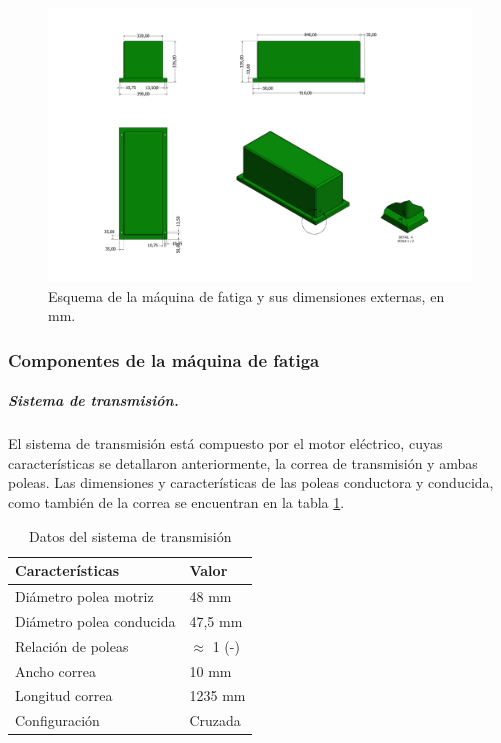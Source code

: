 \begin{figure}[h]
\centering
\includegraphics[width=1\linewidth, trim={10cm 37cm 17cm 2cm},clip]{Imagenes/MaqFatiga-1.pdf}
\caption{Esquema de la máquina de fatiga y sus dimensiones externas, en mm.}
\label{fig:diag_maqfat}
\end{figure}

\subsubsection{Componentes de la máquina de fatiga}
\subparagraph{Sistema de transmisión.}
El sistema de transmisión está compuesto por el motor eléctrico, cuyas características se detallaron anteriormente, la correa de transmisión y ambas poleas. Las dimensiones y características de las poleas conductora y conducida, como también de la correa se encuentran en la tabla \ref{tab:sist_transmision}. 

\begin{table}[h]
\centering
\begin{tabular}{@{}ll@{}}
\toprule
Características          & Valor   			\\ \midrule
Diámetro polea motriz    & 48 mm   			\\
Diámetro polea conducida & 47,5 mm 			\\
Relación de poleas		 & $\approx$ 1 (-) 	\\
Ancho correa             & 10 mm   			\\
Longitud correa          & 1235 mm 			\\
Configuración            & Cruzada 			\\ \bottomrule
\end{tabular}
\caption{Datos del sistema de transmisión}
\label{tab:sist_transmision}
\end{table}

